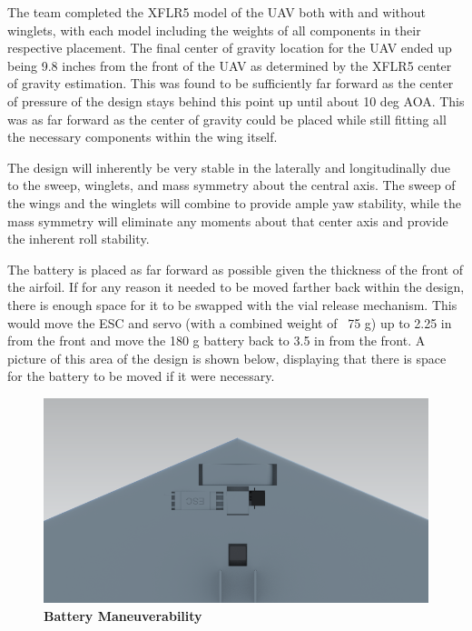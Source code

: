     The team completed the XFLR5 model of the UAV both with and without winglets, with each model including the weights of all components in their respective placement. The final center of gravity location for the UAV ended up being 9.8 inches from the front of the UAV as determined by the XFLR5 center of gravity estimation. This was found to be sufficiently far forward as the center of pressure of the design stays behind this point up until about 10 deg AOA. This was as far forward as the center of gravity could be placed while still fitting all the necessary components within the wing itself. 
    
    The design will inherently be very stable in the laterally and longitudinally due to the sweep, winglets, and mass symmetry about the central axis. The sweep of the wings and the winglets will combine to provide ample yaw stability, while the mass symmetry will eliminate any moments about that center axis and provide the inherent roll stability. 
    
    The battery is placed as far forward as possible given the thickness of the front of the airfoil. If for any reason it needed to be moved farther back within the design, there is enough space for it to be swapped with the vial release mechanism. This would move the ESC and servo (with a combined weight of ~75 g) up to 2.25 in from the front and move the 180 g battery back to 3.5 in from the front. A picture of this area of the design is shown below, displaying that there is space for the battery to be moved if it were necessary.

    \begin{figure}[H]
        \centering
        \includegraphics[scale=0.5]{homeworks/homework4/report/Figure/battery_location.png}
        \caption{\textbf{Battery Maneuverability}}
        \label{fig:Battery Location}
    \end{figure}

